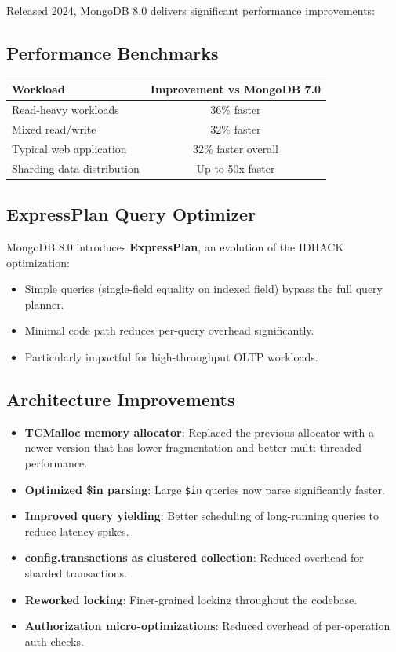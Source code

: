 \documentclass[12pt,a4paper]{article}
\begin{document}
Released 2024, MongoDB 8.0 delivers significant performance improvements:

\subsection{Performance Benchmarks}

\begin{center}
\begin{tabular}{lc}
\toprule
\textbf{Workload} & \textbf{Improvement vs MongoDB 7.0} \\
\midrule
Read-heavy workloads & 36\% faster \\
Mixed read/write & 32\% faster \\
Typical web application & 32\% faster overall \\
Sharding data distribution & Up to 50x faster \\
\bottomrule
\end{tabular}
\end{center}

\subsection{ExpressPlan Query Optimizer}

MongoDB 8.0 introduces \textbf{ExpressPlan}, an evolution of the IDHACK optimization:

\begin{itemize}
    \item Simple queries (single-field equality on indexed field) bypass the full query planner.
    \item Minimal code path reduces per-query overhead significantly.
    \item Particularly impactful for high-throughput OLTP workloads.
\end{itemize}

\subsection{Architecture Improvements}

\begin{itemize}
    \item \textbf{TCMalloc memory allocator}: Replaced the previous allocator with a newer version that has lower fragmentation and better multi-threaded performance.
    \item \textbf{Optimized \$in parsing}: Large \texttt{\$in} queries now parse significantly faster.
    \item \textbf{Improved query yielding}: Better scheduling of long-running queries to reduce latency spikes.
    \item \textbf{config.transactions as clustered collection}: Reduced overhead for sharded transactions.
    \item \textbf{Reworked locking}: Finer-grained locking throughout the codebase.
    \item \textbf{Authorization micro-optimizations}: Reduced overhead of per-operation auth checks.
\end{itemize}
\end{document}
